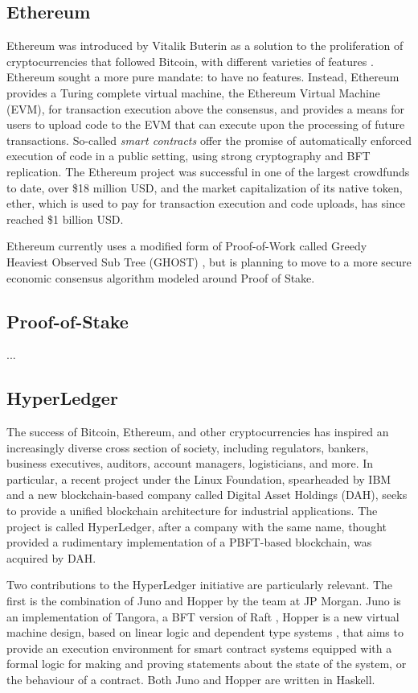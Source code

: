 \subsection{Ethereum}

Ethereum was introduced by Vitalik Buterin as a solution to the proliferation of cryptocurrencies that followed Bitcoin,
with different varieties of features \cite{buterin2013ethereum}.
Ethereum sought a more pure mandate: to have no features.
Instead, Ethereum provides a Turing complete virtual machine, the Ethereum Virtual Machine (EVM), for transaction execution above the consensus,
and provides a means for users to upload code to the EVM that can execute upon the processing of future transactions.
So-called \emph{smart contracts} \cite{} offer the promise of automatically enforced execution of code in a public setting, 
using strong cryptography and BFT replication. 
The Ethereum project was successful in one of the largest crowdfunds to date, over \$18 million USD, 
and the market capitalization of its native token, ether, which is used to pay for transaction execution and code uploads,
has since reached \$1 billion USD.

Ethereum currently uses a modified form of Proof-of-Work called Greedy Heaviest Observed Sub Tree (GHOST) \cite{ghost},
but is planning to move to a more secure economic consensus algorithm modeled around Proof of Stake.

\subsection{Proof-of-Stake}
...

\subsection{HyperLedger}

The success of Bitcoin, Ethereum, and other cryptocurrencies has inspired an increasingly diverse cross section of society,
including regulators, bankers, business executives, auditors, account managers, logisticians, and more.
In particular, a recent project under the Linux Foundation, spearheaded by IBM and a new blockchain-based company called Digital Asset Holdings (DAH), 
seeks to provide a unified blockchain architecture for industrial applications. The project is called HyperLedger,
after a company with the same name, thought provided a rudimentary implementation of a PBFT-based blockchain, was acquired by DAH.

Two contributions to the HyperLedger initiative are particularly relevant.
The first is the combination of Juno and Hopper by the team at JP Morgan.
Juno is an implementation of Tangora, a BFT version of Raft \cite{tangora},
Hopper is a new virtual machine design,
based on linear logic \cite{girard1987linear} and dependent type systems \cite{bove2009dependent},
that aims to provide an execution environment for smart contract systems equipped with a formal logic
for making and proving statements about the state of the system, or the behaviour of a contract.
Both Juno and Hopper are written in Haskell.

